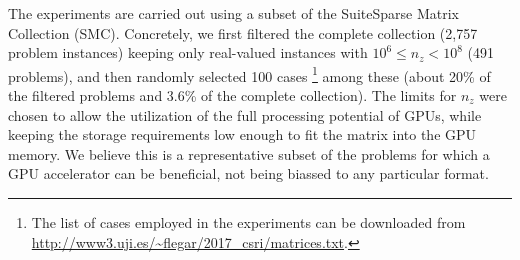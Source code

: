 The experiments are carried out using a subset
of the SuiteSparse Matrix Collection (SMC).
Concretely, we first filtered the complete collection (2,757 problem instances)
keeping only real-valued instances with $10^6 \leq n_z < 10^8$ (491 problems),
and then randomly selected 100 cases%
\footnote{The list of cases employed in the experiments can be downloaded from
\mbox{\url{http://www3.uji.es/~flegar/2017_csri/matrices.txt}}.}
among these
(about 20\% of the filtered problems and 3.6\% of the complete collection). 
The limits for $n_z$ were chosen to allow the utilization
of the full processing potential of GPUs,
while keeping the storage requirements low enough
to fit the matrix into the GPU memory.
We believe this is a representative subset of the
problems for which a GPU accelerator can be beneficial,
not being biassed to any particular format.

